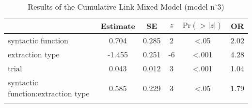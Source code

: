 \begin{table}
\begin{tabular}{l S[table-format=-1.3] S[table-format=1.3] S[table-format=-1.0] S[table-format=<1.3] S[table-format=1.2]}
  \lsptoprule
 & {Estimate} & {SE} & {$z$} & {$\text{Pr}(>|z|)$} & {OR} \\ 
  \midrule
  syntactic function & 0.704 & 0.285 & 2 & <.05 & 2.02 \\ 
  extraction type & -1.455 & 0.251 & -6 & <.001 & 4.28 \\ 
  trial & 0.043 & 0.012 & 3 & <.001 & 1.04 \\ 
  syntactic function:extraction type & 0.585 & 0.229 & 3 & <.05 & 1.79 \\ 
\lspbottomrule
\end{tabular}
\caption{Results of the Cumulative Link Mixed Model (model n$^{\circ}$3)}
\label{tab:exp16-m3}
\end{table}
